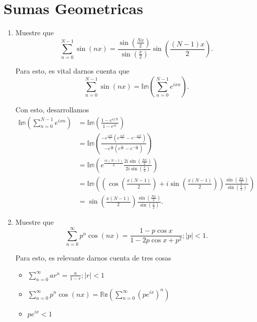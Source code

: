 \documentclass{report}
\begin{document}
\section{Sumas Geometricas}
\begin{enumerate}
  \item Muestre que \[
  \sum_{n=0}^{N-1}\sin\left( nx \right) = \frac{\sin\left( \frac{Nx}{2} \right) }{\sin\left( \frac{x}{2} \right) }\sin\left( \frac{\left( N-1 \right) x}{2} \right) 
  .\] 

  Para esto, es vital darnos cuenta que \[
    \sum_{n=0}^{N-1}\sin\left( nx \right) = \mathbb{Im}\left( \sum_{n=0}^{N-1}e^{ixn} \right) 
  .\] 

  Con esto, desarrollamos
  \begin{align*}
    \mathbb{Im}\left( \sum_{n=0}^{N-1} e^{ixn} \right) &= \mathbb{Im}\left( \frac{1-e^{ixN}}{1-e^{ix}} \right)  \\
    &= \mathbb{Im}\left( \frac{-e^{\frac{ixN}{2}}\left( e^{\frac{ixN}{2}} - e^{-\frac{ixN}{2}} \right) }{-e^{\frac{ix}{2}}\left( e^{\frac{ix}{2}} - e^{-\frac{ix}{2}} \right) } \right) \\
    &=\mathbb{Im}\left( e^{\frac{ix\left( N-1 \right) }{2}} \frac{2i\sin\left( \frac{Nx}{2} \right) }{2i\sin\left( \frac{x}{2} \right) } \right) \\
    &= \mathbb{Im}\left( \left( \cos\left( \frac{x\left( N-1 \right) }{2} \right)+ i\sin\left( \frac{x\left( N-1 \right) }{2} \right)  \right) \frac{\sin\left( \frac{Nx}{2} \right) }{\sin\left( \frac{x}{2} \right) } \right) \\
    &= \sin\left( \frac{x\left( N-1 \right) }{2} \right) \frac{\sin\left( \frac{Nx}{2} \right) }{\sin\left( \frac{x}{2} \right) }
  .\end{align*}

\item Muestre que \[
\sum_{n=0}^{\infty} p^{n}\cos\left( nx \right) = \frac{1-p\cos x}{1 - 2p\cos x + p^2}; |p|< 1
.\] 

Para esto, es relevante darnos cuenta de tres cosas
\begin{itemize}
  \item $\displaystyle \sum_{n=0}^{\infty} ar^{n}= \frac{a}{1-r} ; |r|<1$
  \item $\displaystyle \sum_{n=0}^{\infty} p^{n}\cos\left( nx \right) = \mathbb{Re}\left(\sum_{n=0}^{\infty} \left( pe^{ix} \right)^{n}\right) $
  \item $pe^{ix}<1$
\end{itemize}


\end{enumerate}
\end{document}
